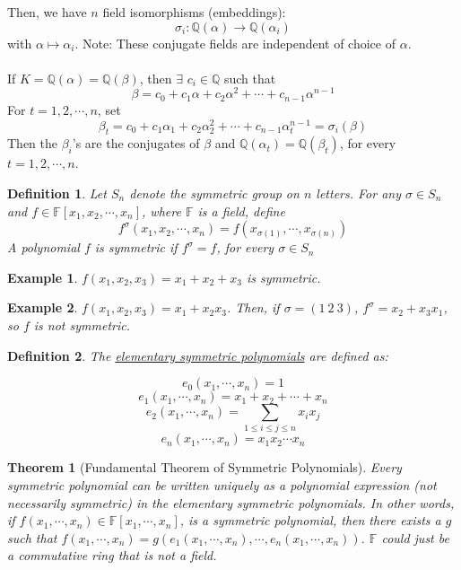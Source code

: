 \documentclass{article}
\newcommand{\Q}{\mathbb{Q}}
\newtheorem{theorem}{Theorem}
\newtheorem{example}{Example}
\newtheorem{definition}{Definition}
\begin{document}
Then, we have $n$ field isomorphisms (embeddings):
$$\sigma_i: \Q(\alpha)\rightarrow \Q(\alpha_i)$$
with $\alpha\mapsto \alpha_i$.
Note: These conjugate fields are independent of choice of $\alpha$. \\
\\
If $K=\Q(\alpha)=\Q(\beta)$, then $\exists$ $c_i\in\Q$ such that
$$\beta = c_0+c_1\alpha + c_2\alpha^2+\cdots + c_{n-1}\alpha^{n-1}$$
For $t=1,2,\cdots, n$, set
$$\beta_t=c_0+c_1\alpha_1+c_2\alpha_2^2+\cdots + c_{n-1}\alpha_t^{n-1}=\sigma_i(\beta)$$
Then the $\beta_i$'s are the conjugates of $\beta$ and $\Q(\alpha_t)=\Q(\beta_t)$, for every $t=1,2,\cdots, n$.
\begin{definition}
Let $S_n$ denote the symmetric group on $n$ letters. For any $\sigma\in S_n$ and $f\in\mathbb{F}[x_1,x_2,\cdots, x_n]$, where $\mathbb{F}$ is a field, define
$$f^\sigma(x_1,x_2,\cdots, x_n)=f(x_{\sigma(1)},\cdots, x_{\sigma(n)})$$
A polynomial $f$ is symmetric if $f^\sigma=f$, for every $\sigma\in S_n$
\end{definition}
\begin{example}
$f(x_1,x_2,x_3)=x_1+x_2+x_3$ is symmetric. 
\end{example}
\begin{example}
$f(x_1,x_2,x_3)=x_1+x_2x_3$. Then, if $\sigma = (1\ 2\ 3)$, $f^\sigma=x_2+x_3x_1$, so $f$ is not symmetric.
\end{example}
\begin{definition}
The \underline{elementary symmetric polynomials} are defined as:

$$e_0(x_1,\cdots, x_n) = 1$$
$$e_1(x_1,\cdots, x_n)=x_1+x_2+\cdots + x_n$$
$$e_2(x_1,\cdots, x_n) = \displaystyle\sum_{1\leq i\leq j\leq n}x_ix_j$$
$$e_n(x_1,\cdots, x_n)=x_1x_2\cdots x_n$$
\end{definition}
\begin{theorem}[Fundamental Theorem of Symmetric Polynomials]
Every symmetric polynomial can be written uniquely as a polynomial expression (not necessarily symmetric) in the elementary symmetric polynomials. In other words, if $f(x_1,\cdots, x_n)\in\mathbb{F}[x_1,\cdots, x_n]$, is a symmetric polynomial, then there exists a $g$ such that $f(x_1,\cdots, x_n)=g(e_1(x_1,\cdots, x_n),\cdots, e_n(x_1,\cdots, x_n))$. $\mathbb{F}$ could just be a commutative ring that is not a field.
\end{theorem}
\newpage
\end{document}
